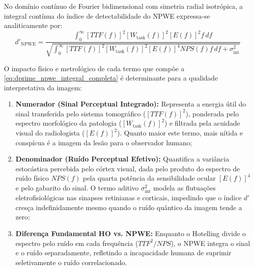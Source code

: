 \documentclass[
  12pt,
  a4paper,
  oneside
]{report}
\begin{document}
No domínio contínuo de Fourier bidimensional com simetria radial isotrópica, a integral contínua do índice de detectabilidade do NPWE expressa-se analiticamente por:
\begin{equation}
  d'_{\text{NPWE}} = \frac{\displaystyle \int_0^{\infty} \left[ TTF(f) \right]^2 \left[ W_{\text{task}}(f) \right]^2 \left[ E(f) \right]^2 f \, df}{\displaystyle \sqrt{\int_0^{\infty} \left[ TTF(f) \right]^2 \left[ W_{\text{task}}(f) \right]^2 \left[ E(f) \right]^4 NPS(f) f \, df + \sigma_{\text{int}}^2}}
  \label{eq:dprime_npwe_integral_completa}
\end{equation}

O impacto físico e metrológico de cada termo que compõe a \cref{eq:dprime_npwe_integral_completa} é determinante para a qualidade interpretativa da imagem:
\begin{enumerate}
  \item \textbf{Numerador (Sinal Perceptual Integrado):} Representa a energia útil do sinal transferida pelo sistema tomográfico ($\left[ TTF(f) \right]^2$), ponderada pelo espectro morfológico da patologia ($\left[ W_{\text{task}}(f) \right]^2$) e filtrada pela acuidade visual do radiologista ($\left[ E(f) \right]^2$). Quanto maior este termo, mais nítida e conspícua é a imagem da lesão para o observador humano;
  \item \textbf{Denominador (Ruído Perceptual Efetivo):} Quantifica a variância estocástica percebida pelo córtex visual, dada pelo produto do espectro de ruído físico $NPS(f)$ pela quarta potência da sensibilidade ocular $\left[ E(f) \right]^4$ e pelo gabarito do sinal. O termo aditivo $\sigma_{\text{int}}^2$ modela as flutuações eletrofisiológicas nas sinapses retinianas e corticais, impedindo que o índice $d'$ cresça indefinidamente mesmo quando o ruído quântico da imagem tende a zero;
  \item \textbf{Diferença Fundamental HO vs. NPWE:} Enquanto o Hotelling divide o espectro pelo ruído em cada frequência ($TTF^2/NPS$), o NPWE integra o sinal e o ruído separadamente, refletindo a incapacidade humana de suprimir seletivamente o ruído correlacionado.
\end{enumerate}
\end{document}
